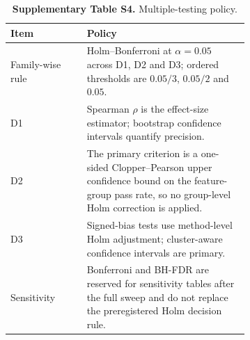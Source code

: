 \begin{table}[htbp]
\centering
\caption{\textbf{Supplementary Table S4.} Multiple-testing policy.}
\label{tab:si_multiple_testing}
\SITableFont
\begin{tabular}{@{}lp{0.68\linewidth}@{}}
\toprule
\textbf{Item} & \textbf{Policy} \\
\midrule
Family-wise rule & Holm--Bonferroni at $\alpha=0.05$ across D1, D2 and D3; ordered thresholds are $0.05/3$, $0.05/2$ and $0.05$. \\
D1 & Spearman $\rho$ is the effect-size estimator; bootstrap confidence intervals quantify precision. \\
D2 & The primary criterion is a one-sided Clopper--Pearson upper confidence bound on the feature-group pass rate, so no group-level Holm correction is applied. \\
D3 & Signed-bias tests use method-level Holm adjustment; cluster-aware confidence intervals are primary. \\
Sensitivity & Bonferroni and BH-FDR are reserved for sensitivity tables after the full sweep and do not replace the preregistered Holm decision rule. \\
\bottomrule
\end{tabular}
\end{table}
